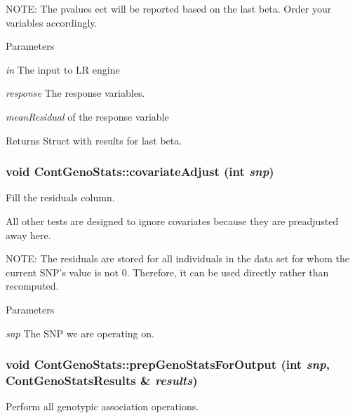 NOTE: The pvalues ect will be reported based on the last beta. Order your variables accordingly.


\begin{DoxyParams}{Parameters}
\item[{\em in}]The input to LR engine \item[{\em response}]The response variables. \item[{\em meanResidual}]of the response variable \end{DoxyParams}
\begin{DoxyReturn}{Returns}
Struct with results for last beta. 
\end{DoxyReturn}
\hypertarget{classContGenoStats_a7a75df670c1ee712c09255c3f4954961}{
\subsubsection[{covariateAdjust}]{\setlength{\rightskip}{0pt plus 5cm}void ContGenoStats::covariateAdjust (int {\em snp})}}
\label{classContGenoStats_a7a75df670c1ee712c09255c3f4954961}
Fill the residuals column.

All other tests are designed to ignore covariates because they are preadjusted away here.

NOTE: The residuals are stored for all individuals in the data set for whom the current SNP's value is not 0. Therefore, it can be used directly rather than recomputed.


\begin{DoxyParams}{Parameters}
\item[{\em snp}]The SNP we are operating on. \end{DoxyParams}
\hypertarget{classContGenoStats_a4b6add4b82e3f7b49594007e8de252e2}{
\subsubsection[{prepGenoStatsForOutput}]{\setlength{\rightskip}{0pt plus 5cm}void ContGenoStats::prepGenoStatsForOutput (int {\em snp}, \/  {\bf ContGenoStatsResults} \& {\em results})}}
\label{classContGenoStats_a4b6add4b82e3f7b49594007e8de252e2}
Perform all genotypic association operations.

